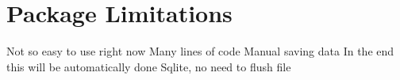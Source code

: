 \section{Package Limitations}
Not so easy to use right now
Many lines of code
Manual saving data
In the end this will be automatically done
Sqlite, no need to flush file